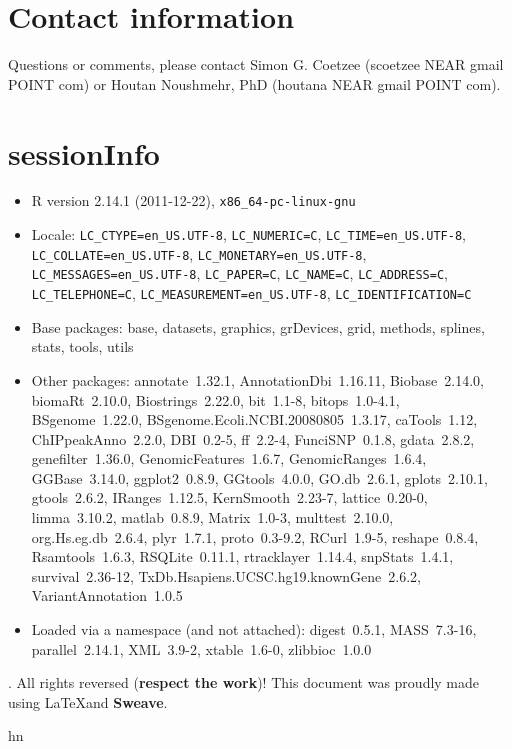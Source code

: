 \documentclass[12pt,fullpage]{article}
\begin{document}
\section{Contact information}
Questions or comments, please contact Simon G. Coetzee (scoetzee NEAR gmail 
 POINT com) or Houtan Noushmehr, PhD (houtana NEAR gmail POINT com).

\section{sessionInfo}                                                            

\begin{itemize}\raggedright
  \item R version 2.14.1 (2011-12-22), \verb|x86_64-pc-linux-gnu|
  \item Locale: \verb|LC_CTYPE=en_US.UTF-8|, \verb|LC_NUMERIC=C|, \verb|LC_TIME=en_US.UTF-8|, \verb|LC_COLLATE=en_US.UTF-8|, \verb|LC_MONETARY=en_US.UTF-8|, \verb|LC_MESSAGES=en_US.UTF-8|, \verb|LC_PAPER=C|, \verb|LC_NAME=C|, \verb|LC_ADDRESS=C|, \verb|LC_TELEPHONE=C|, \verb|LC_MEASUREMENT=en_US.UTF-8|, \verb|LC_IDENTIFICATION=C|
  \item Base packages: base, datasets, graphics, grDevices, grid,
    methods, splines, stats, tools, utils
  \item Other packages: annotate~1.32.1, AnnotationDbi~1.16.11,
    Biobase~2.14.0, biomaRt~2.10.0, Biostrings~2.22.0, bit~1.1-8,
    bitops~1.0-4.1, BSgenome~1.22.0,
    BSgenome.Ecoli.NCBI.20080805~1.3.17, caTools~1.12,
    ChIPpeakAnno~2.2.0, DBI~0.2-5, ff~2.2-4, FunciSNP~0.1.8,
    gdata~2.8.2, genefilter~1.36.0, GenomicFeatures~1.6.7,
    GenomicRanges~1.6.4, GGBase~3.14.0, ggplot2~0.8.9, GGtools~4.0.0,
    GO.db~2.6.1, gplots~2.10.1, gtools~2.6.2, IRanges~1.12.5,
    KernSmooth~2.23-7, lattice~0.20-0, limma~3.10.2, matlab~0.8.9,
    Matrix~1.0-3, multtest~2.10.0, org.Hs.eg.db~2.6.4, plyr~1.7.1,
    proto~0.3-9.2, RCurl~1.9-5, reshape~0.8.4, Rsamtools~1.6.3,
    RSQLite~0.11.1, rtracklayer~1.14.4, snpStats~1.4.1,
    survival~2.36-12, TxDb.Hsapiens.UCSC.hg19.knownGene~2.6.2,
    VariantAnnotation~1.0.5
  \item Loaded via a namespace (and not attached): digest~0.5.1,
    MASS~7.3-16, parallel~2.14.1, XML~3.9-2, xtable~1.6-0,
    zlibbioc~1.0.0
\end{itemize}
. All rights reversed (\textbf{respect the work})! This
document was proudly made using \LaTeX and \textbf{Sweave}.

hn
\end{document}
